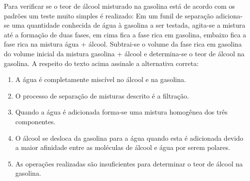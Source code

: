 Para verificar se o teor de álcool misturado na gasolina está de acordo com os
padrões um teste muito simples é realizado: Em um funil de separação adiciona-se uma quantidade conhecida de água à gasolina a ser testada, agita-se a mistura
até a formação de duas fases, em cima fica a fase rica em gasolina, embaixo fica
a fase rica na mistura água + álcool. Subtrai-se o volume da fase rica em gasolina
do volume inicial da mistura gasolina + álcool e determina-se o teor de álcool na
gasolina. A respeito do texto acima assinale a alternativa correta:

\begin{enumerate}[label = (\alph*)]
	\item A água é completamente miscível no álcool e na gasolina.
	\item O processo de separação de misturas descrito é a filtração.
	\item Quando a água é adicionada forma-se uma mistura homogênea dos três componentes.
	\item O álcool se desloca da gasolina para a água quando esta é adicionada devido a maior afinidade entre as moléculas de álcool e água por serem polares.
	\item As operações realizadas são insuficientes para determinar o teor de álcool na gasolina.
\end{enumerate}
